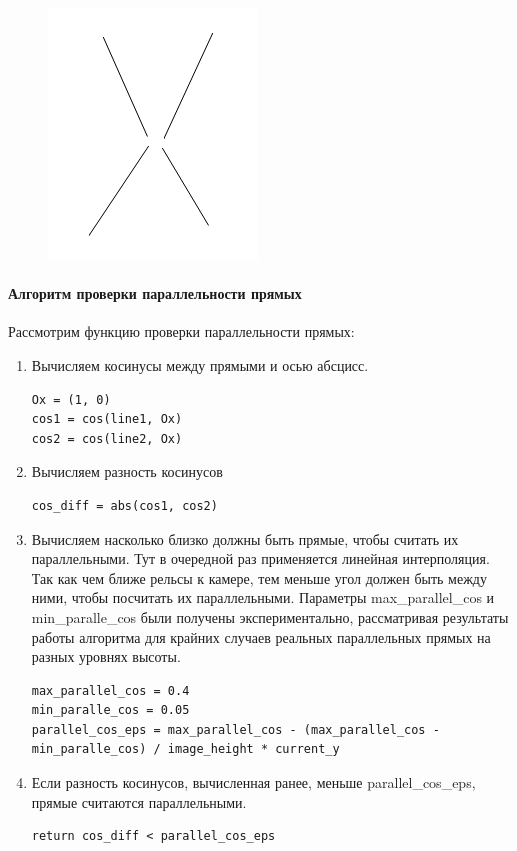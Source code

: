 \begin{enumerate}
\begin{figure}[!h]
\begin{minipage}{0.45\textwidth}
			\includegraphics[width=0.7\linewidth]{pictures/X_cross}
			\caption[X]{}
			\label{fig:xcross_revert}
		\end{minipage}
	\end{figure}
\end{enumerate}
\newpage

\paragraph{Алгоритм проверки параллельности прямых}
Рассмотрим функцию проверки параллельности прямых:
\begin{enumerate}
	\item Вычисляем косинусы между прямыми и осью абсцисс.
	\begin{lstlisting}
Ox = (1, 0)
cos1 = cos(line1, Ox)
cos2 = cos(line2, Ox)
	\end{lstlisting}
	\item Вычисляем разность косинусов
	\begin{lstlisting}
cos_diff = abs(cos1, cos2)
	\end{lstlisting}
	\item Вычисляем насколько близко должны быть прямые, чтобы считать их параллельными. Тут в очередной раз применяется линейная интерполяция. Так как чем ближе рельсы к камере, тем меньше угол должен быть между ними, чтобы посчитать их параллельными. Параметры max\_parallel\_cos и min\_paralle\_cos были получены экспериментально, рассматривая результаты работы алгоритма для крайних случаев 
	реальных параллельных прямых на разных уровнях высоты.
	\begin{lstlisting}
max_parallel_cos = 0.4
min_paralle_cos = 0.05
parallel_cos_eps = max_parallel_cos - (max_parallel_cos - 
min_paralle_cos) / image_height * current_y
	\end{lstlisting}
	\item Если разность косинусов, вычисленная ранее, меньше parallel\_cos\_eps, прямые считаются параллельными.
	\begin{lstlisting}
return cos_diff < parallel_cos_eps
	\end{lstlisting}
\end{enumerate}              
